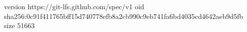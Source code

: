 version https://git-lfs.github.com/spec/v1
oid sha256:0c91f411765bff15d740778efb8a2cb990c9eb741fa6bd4035cd4642aeb9d5fb
size 51663
